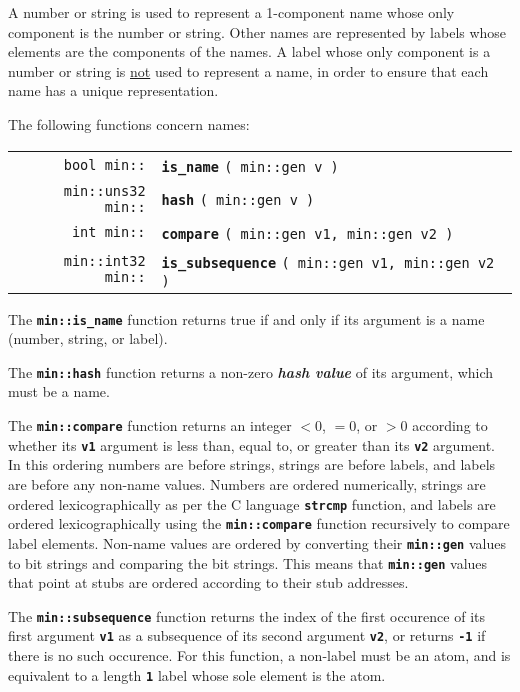 \documentclass[12pt]{article}
\makeatletter
\newcommand{\TT}[1]{{\tt \bfseries #1}}
\newcommand{\key}[1]{{\bf \em #1}\index{#1}}
\newcommand{\ttindex}[1]{\index{#1@{\tt #1}}}
\newcommand{\minindex}[1]{\ttindex{min::#1}\ttindex{#1}}
\newcommand{\EOL}{\penalty \exhyphenpenalty}
\newenvironment{indpar}[1][0.3in]%
	{\begin{list}{}%
		     {\setlength{\itemsep}{0in}%
		      \setlength{\topsep}{0in}%
		      \setlength{\parsep}{1ex}%
		      \setlength{\labelwidth}{#1}%
		      \setlength{\leftmargin}{#1}%
		      \addtolength{\leftmargin}{\labelsep}}%
	 \item}%
	{\end{list}}
\newcommand{\LABEL}[1]{\label{#1}}
\newcommand{\MINKEY}[1]{{\tt \bf #1}\minindex{#1}}
\makeatother
\begin{document}
A number or string is used to represent a 1-component name whose
only component is the number or string.  Other names are represented
by labels whose elements are the components of the names.  A label whose
only component is a number or string is \underline{not}
used to represent a name, in order to ensure that each name has a unique
representation.

The following functions concern names:

\begin{indpar}\begin{tabular}{r@{}l}
\verb|bool min::| & \MINKEY{is\_name} \verb|( min::gen v )|
\LABEL{MIN::IS_NAME} \\
\verb|min::uns32 min::| & \MINKEY{hash} \verb|( min::gen v )|
\LABEL{MIN::HASH} \\
\verb|int min::| & \MINKEY{compare} \verb|( min::gen v1, min::gen v2 )|
\LABEL{MIN::COMPARE} \\
\verb|min::int32 min::| & \MINKEY{is\_subsequence}
    \verb|( min::gen v1, min::gen v2 )|
\LABEL{MIN::IS_SUBSEQUENCE} \\
\end{tabular}\end{indpar}

The \TT{min::is\_name} function returns true if and only if its argument is
a name (number, string, or label).

The \TT{min::hash} function returns a non-zero
\key{hash value}\label{HASH-VALUE} of its argument, which must be
a name.

The \TT{min::compare} function returns an integer $<0$, $=0$, or $>0$
according to whether its \TT{v1} argument is less than, equal to, or
greater than its \TT{v2} argument.
In this ordering numbers are
before strings, strings are before labels, and labels are before
any non-name values.  Numbers are ordered
numerically, strings are ordered lexicographically as per the
C language \TT{strcmp} function, and labels are ordered lexicographically
using the \TT{min::\EOL compare} function recursively to compare
label elements.  Non-name values are ordered by converting their
\TT{min::gen} values to bit strings and comparing the bit strings.
This means that \TT{min::gen} values that point at stubs are ordered
according to their stub addresses.

The \TT{min::subsequence} function
returns the index of the first occurence
of its first argument \TT{v1} as a subsequence of its second
argument \TT{v2}, or returns \TT{-1} if there is no such
occurence.  For this function,
a non-label must be an atom, and is equivalent to a length \TT{1} label
whose sole element is the atom.
\end{document}
